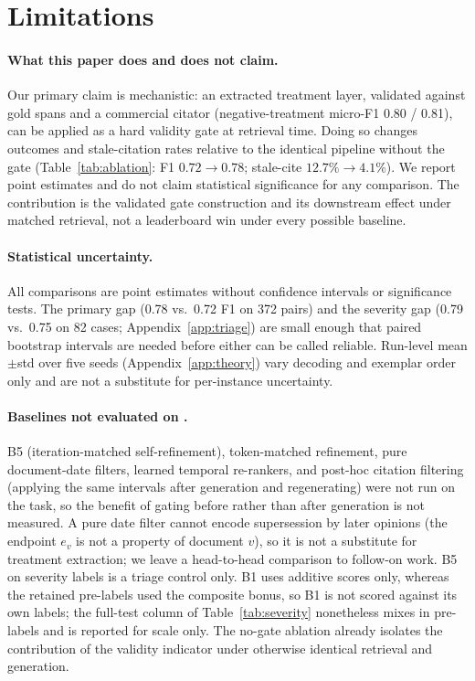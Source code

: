 \section*{Limitations}
\label{sec:limitations}

\paragraph{What this paper does and does not claim.}
Our primary claim is mechanistic: an extracted treatment layer, validated against gold spans and a commercial citator (negative-treatment micro-F1 0.80 / 0.81), can be applied as a hard validity gate at retrieval time.
Doing so changes \plre{} outcomes and stale-citation rates relative to the identical pipeline without the gate (Table~\ref{tab:ablation}: F1 $0.72 \to 0.78$; stale-cite $12.7\% \to 4.1\%$).
We report point estimates and do not claim statistical significance for any comparison.
The contribution is the validated gate construction and its downstream effect under matched retrieval, not a leaderboard win under every possible baseline.

\paragraph{Statistical uncertainty.}
All comparisons are point estimates without confidence intervals or significance tests.
The primary \plre{} gap (0.78 vs.\ 0.72 F1 on 372 pairs) and the severity gap (0.79 vs.\ 0.75 on 82 cases; Appendix~\ref{app:triage}) are small enough that paired bootstrap intervals are needed before either can be called reliable.
Run-level mean$\pm$std over five seeds (Appendix~\ref{app:theory}) vary decoding and exemplar order only and are not a substitute for per-instance uncertainty.

\paragraph{Baselines not evaluated on \plre.}
B5 (iteration-matched self-refinement), token-matched refinement, pure document-date filters, learned temporal re-rankers, and post-hoc citation filtering (applying the same intervals after generation and regenerating) were not run on the \plre{} task, so the benefit of gating before rather than after generation is not measured.
A pure date filter cannot encode supersession by later opinions (the endpoint $e_v$ is not a property of document $v$), so it is not a substitute for treatment extraction; we leave a head-to-head comparison to follow-on work.
B5 on severity labels is a triage control only.
B1 uses additive scores only, whereas the retained pre-labels used the composite bonus, so B1 is not scored against its own labels; the full-test column of Table~\ref{tab:severity} nonetheless mixes in pre-labels and is reported for scale only.
The no-gate ablation already isolates the contribution of the validity indicator under otherwise identical retrieval and generation.

